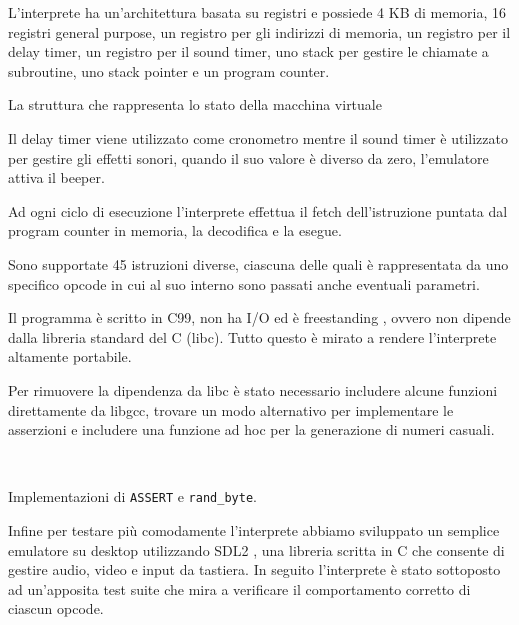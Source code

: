 \documentclass[a4paper]{article}
\begin{document}
L'interprete ha un'architettura basata su registri e possiede 4 KB di memoria, 16 registri
general purpose, un registro per gli indirizzi di memoria, un registro per il delay timer,
un registro per il sound timer, uno stack per gestire le chiamate a subroutine, uno stack pointer
e un program counter.

\begin{Listing}[h!t] %
    \centering
    \caption{La struttura che rappresenta lo stato della macchina virtuale}
    \label{chip8_struct}
\end{Listing}

Il delay timer viene utilizzato come cronometro mentre il sound
timer è utilizzato per gestire gli effetti sonori, quando il suo
valore è diverso da zero, l'emulatore attiva il beeper.

Ad ogni ciclo di esecuzione l'interprete effettua il fetch
dell'istruzione puntata dal program counter in memoria,
la decodifica e la esegue.

Sono supportate 45 istruzioni diverse, ciascuna delle
quali è rappresentata da uno specifico opcode in cui al suo interno
sono passati anche eventuali parametri.

Il programma è scritto in C99, non ha I/O ed è freestanding
\cite{n1256:conformance}, ovvero non dipende dalla libreria
standard del C (libc). Tutto questo è mirato a rendere l'interprete
altamente portabile.

Per rimuovere la dipendenza da libc è stato necessario includere
alcune funzioni direttamente da libgcc, trovare un modo alternativo
per implementare le asserzioni e includere una funzione ad hoc per
la generazione di numeri casuali.


\begin{Listing}[h!t]
    \centering
    \mbox{
        \quad
    }
    \caption{Implementazioni di \texttt{ASSERT} e \texttt{rand\_byte}.}
    \label{assert_rand}
\end{Listing}

Infine per testare più comodamente l'interprete abbiamo sviluppato
un semplice emulatore su desktop utilizzando SDL2
\cite{libsdl:about}, una libreria scritta in C che consente di
gestire audio, video e input da tastiera.
In seguito l'interprete è stato sottoposto ad un'apposita
test suite \cite{github:chip8-test-suite} che mira a verificare
il comportamento corretto di ciascun opcode.
\end{document}
